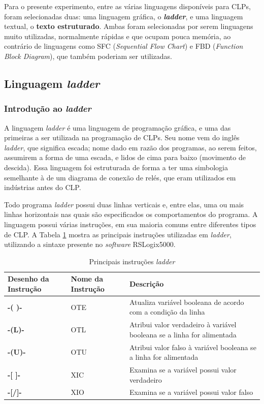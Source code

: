 Para o presente experimento, entre as várias linguagens disponíveis para CLPs, foram selecionadas duas: uma linguagem gráfica, o \textbf{\textit{ladder}}, e uma linguagem textual, o \textbf{texto estruturado}. Ambas foram selecionadas por serem linguagens muito utilizadas, normalmente rápidas e que ocupam pouca memória, ao contrário de linguagens como SFC (\textit{Sequential Flow Chart}) e FBD (\textit{Function Block Diagram}), que também poderiam ser utilizadas.

\subsection{Linguagem \textit{ladder}}
\subsubsection{Introdução ao \textit{ladder}}
A linguagem \textit{ladder} é uma linguagem de programação gráfica, e uma das primeiras a ser utilizada na programação de CLPs. Seu nome vem do inglês \textit{ladder}, que significa escada; nome dado em razão dos programas, ao serem feitos, assumirem a forma de uma escada, e lidos de cima para baixo (movimento de descida). Essa linguagem foi estruturada de forma a ter uma simbologia semelhante à de um diagrama de conexão de relés, que eram utilizados em indústrias antes do CLP.

Todo programa \textit{ladder} possui duas linhas verticais e, entre elas, uma ou mais linhas horizontais nas quais são especificados os comportamentos do programa. A linguagem possui várias instruções, em sua maioria comuns entre diferentes tipos de CLP. A Tabela \ref{ladder1} mostra as principais instruções utilizadas em \textit{ladder}, utilizando a sintaxe presente no \textit{software} RSLogix5000.

\begin{table}[!ht]
  \centering
  \caption{Principais instruções \textit{ladder} \label{ladder1}}
  \begin{tabularx}{\textwidth}{|>{\bfseries}l|l|X|}
    \hline
    Desenho da Instrução & Nome da Instrução & Descrição \\ \hline
    -( )- & OTE & Atualiza variável booleana de acordo com a condição da linha \\ \hline
    -(L)- & OTL & Atribui valor verdadeiro à variável booleana se a linha for alimentada \\ \hline
    -(U)- & OTU & Atribui valor falso à variável booleana se a linha for alimentada \\ \hline
    -[ ]- & XIC & Examina se a variável possui valor verdadeiro \\ \hline
    -[/]- & XIO & Examina se a variável possui valor falso \\ \hline
  \end{tabularx}
\end{table}

